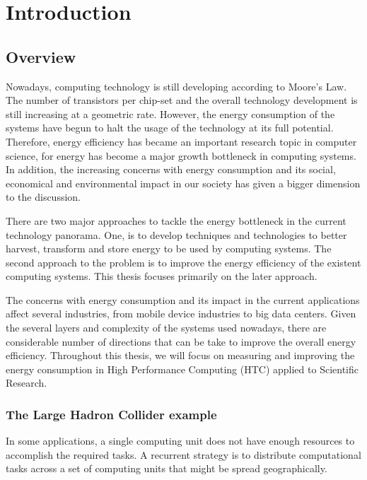 \chapter{Introduction}

\section{Overview}
Nowadays, computing technology is still developing according to Moore's Law. The number of transistors per
chip-set and the overall technology development is still increasing at a geometric rate. However, the energy
consumption of the systems have begun to halt the usage of the technology at its
full potential. Therefore, energy efficiency has became an important
research topic in computer science, for energy has become a major growth
bottleneck in computing systems. In addition, the increasing concerns with energy consumption and
its social, economical and environmental impact in our society has given a
bigger dimension to the discussion.


There are two major approaches to tackle the energy bottleneck in the current
technology panorama. One, is to develop techniques and technologies to better harvest, 
transform and store energy to be used by computing systems. The second approach to the problem is to improve the energy efficiency of the existent computing systems. This thesis focuses primarily on the later approach. 

The concerns with energy consumption and its impact in the current
applications affect several industries, from mobile device industries to big data centers. 
Given the several layers and complexity of the systems used nowadays, there are 
considerable number of directions that can be take to improve the overall energy efficiency. Throughout this thesis, we will focus on measuring and improving the energy
consumption in High Performance Computing (HTC) applied to Scientific Research.


\subsection*{The Large Hadron Collider example}
In some applications, a single computing unit does not have enough resources to
accomplish the required tasks. A recurrent strategy is to distribute computational tasks
across a set of computing units that might be spread geographically.

